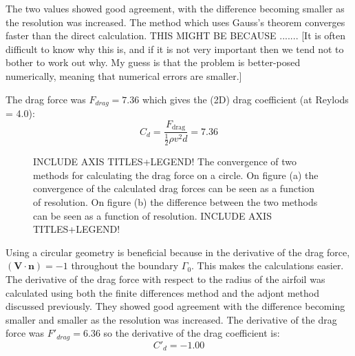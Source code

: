 \documentclass[12pt, a4paper]{article}
\begin{document}
The two values showed good agreement, with the difference becoming smaller as the resolution was increased. The method which uses Gauss's theorem converges faster than the direct calculation. THIS MIGHT BE BECAUSE ....... [It is often difficult to know why this is, and if it is not very important then we tend not to bother to work out why. My guess is that the problem is better-posed numerically, meaning that numerical errors are smaller.]

The drag force was $F_{drag} = 7.36$ which gives the (2D) drag coefficient (at Reylods = 4.0):
\begin{equation}
C_d = \frac{F_{\text{drag}}}{\frac{1}{2} \rho v^2 d} = 7.36
\end{equation}
\begin{figure}[hbtp]
    \centering
    \qquad
    \caption{INCLUDE AXIS TITLES+LEGEND! The convergence of two methods for calculating the drag force on a circle. On figure (a) the convergence of the calculated drag forces can be seen as a function of resolution. On figure (b) the difference between the two methods can be seen as a function of resolution. INCLUDE AXIS TITLES+LEGEND!}
    \label{fig:circle_convergence}
\end{figure}

Using a circular geometry is beneficial because in the derivative of the drag force, $(\mathbf{V \cdot n}) = -1$ throughout the boundary $\Gamma_0$. This makes the calculations easier. The derivative of the drag force with respect to the radius of the airfoil was calculated using both the finite differences method and the adjont method discussed previously. They showed good agreement with the difference becoming smaller and smaller as the resolution was increased. The derivative of the drag force was $F'_{drag} = 6.36$ so the derivative of the drag coefficient is:
\begin{equation}
C'_d = -1.00
\end{equation}
\end{document}
